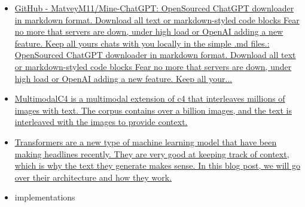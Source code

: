 \begin{itemize}
{  station is here (other)}
\item
  \href{https://github.com/MatveyM11/Mine-ChatGPT}{GitHub -
  MatveyM11/Mine-ChatGPT: OpenSourced ChatGPT downloader in markdown
  format. Download all text or markdown-styled code blocks Fear no more
  that servers are down, under high load or OpenAI adding a new feature.
  Keep all yours chat\textquotesingle s with you locally in the simple
  .md files.: OpenSourced ChatGPT downloader in markdown format.
  Download all text or markdown-styled code blocks Fear no more that
  servers are down, under high load or OpenAI adding a new feature. Keep
  all your...}
\item
  \href{https://github.com/allenai/mmc4}{MultimodalC4 is a multimodal
  extension of c4 that interleaves millions of images with text. The
  corpus contains over a billion images, and the text is interleaved
  with the images to provide context.}
\item
  \href{https://txt.cohere.ai/what-are-transformer-models/}{Transformers
  are a new type of machine learning model that have been making
  headlines recently. They are very good at keeping track of context,
  which is why the text they generate makes sense. In this blog post, we
  will go over their architecture and how they work.}
\item
  implementations

  \begin{itemize}
   

\end{itemize}
\end{itemize}
